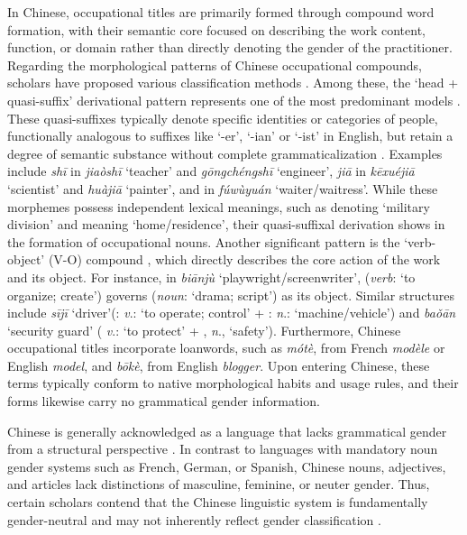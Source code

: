 \documentclass[11pt]{article}
\newcommand{\zh}[1]{\simplifiedchinesefont{#1}\rmfamily}
\begin{document}
In Chinese, occupational titles are primarily formed through compound word formation, with their semantic core focused on describing the work content, function, or domain rather than directly denoting the gender of the practitioner. Regarding the morphological patterns of Chinese occupational compounds, scholars have proposed various classification methods \citep{packard_2000_morphology,fu_2014_chinese}. Among these, the `head + quasi-suffix' derivational pattern represents one of the most predominant models \citep{fu_2014_chinese}. These quasi-suffixes typically denote specific identities or categories of people, functionally analogous to suffixes like `-er', `-ian' or `-ist' in English, but retain a degree of semantic substance without complete grammaticalization \citep{fu_2014_chinese}. Examples include \zh{师} \textit{shī} in \zh{教师} \textit{jiaòshī} `teacher' and \zh{工程师} \textit{gōngchéngshī} `engineer', \zh{家} \textit{jiā} in \zh{科学家} \textit{kēxuéjiā} `scientist' and \zh{画家} \textit{huàjiā} `painter', and \zh{员} in \zh{服务员} \textit{fúwùyuán} `waiter/waitress'. While these morphemes possess independent lexical meanings, such as \zh{师} denoting `military division' and \zh{家} meaning `home/residence', their quasi-suffixal derivation shows in the formation of occupational nouns. Another significant pattern is the `verb-object' (V-O) compound \citep{packard_2000_morphology}, which directly describes the core action of the work and its object. For instance, in \zh{编剧} \textit{biānjù} `playwright/screenwriter', \zh{编} (\textit{verb}: `to organize; create') governs \zh{剧} (\textit{noun}: `drama; script') as its object. Similar structures include \zh{司机} \textit{sījī} `driver'(\zh{司}: \textit{v}.: `to operate; control' + \zh{机}: \textit{n}.: `machine/vehicle') and \zh{保安} \textit{baǒān} `security guard' (\zh{保} \textit{v}.: `to protect' + \zh{安}, \textit{n}., `safety'). Furthermore, Chinese occupational titles incorporate loanwords, such as \zh{模特} \textit{mótè}, from French \textit{modèle} or English \textit{model}, and \zh{博客} \textit{bōkè}, from English \textit{blogger}. Upon entering Chinese, these terms typically conform to native morphological habits and usage rules, and their forms likewise carry no grammatical gender information.

Chinese is generally acknowledged as a language that lacks grammatical gender from a structural perspective \citep{li_1989_mandarin}. In contrast to languages with mandatory noun gender systems such as French, German, or Spanish, Chinese nouns, adjectives, and articles lack distinctions of masculine, feminine, or neuter gender. Thus, certain scholars contend that the Chinese linguistic system is fundamentally gender-neutral and may not inherently reflect gender classification \citep{li_1989_mandarin,packard_2000_morphology}.
\end{document}
